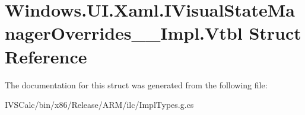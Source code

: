 \hypertarget{struct_windows_1_1_u_i_1_1_xaml_1_1_i_visual_state_manager_overrides_____impl_1_1_vtbl}{}\section{Windows.\+U\+I.\+Xaml.\+I\+Visual\+State\+Manager\+Overrides\+\_\+\+\_\+\+Impl.\+Vtbl Struct Reference}
\label{struct_windows_1_1_u_i_1_1_xaml_1_1_i_visual_state_manager_overrides_____impl_1_1_vtbl}


The documentation for this struct was generated from the following file\+:\begin{DoxyCompactItemize}
\item 
I\+V\+S\+Calc/bin/x86/\+Release/\+A\+R\+M/ilc/Impl\+Types.\+g.\+cs\end{DoxyCompactItemize}
